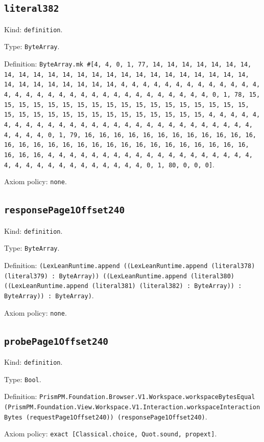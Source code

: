 \documentclass[11pt]{article}
\begin{document}
\subsection*{\texttt{literal382}}
\noindent Kind: \texttt{definition}.\par
\noindent Type: \texttt{ByteArray}.\par
\noindent Definition: \texttt{ByteArray.mk \#[4, 4, 0, 1, 77, 14, 14, 14, 14, 14, 14, 14, 14, 14, 14, 14, 14, 14, 14, 14, 14, 14, 14, 14, 14, 14, 14, 14, 14, 14, 14, 14, 14, 14, 14, 14, 14, 4, 4, 4, 4, 4, 4, 4, 4, 4, 4, 4, 4, 4, 4, 4, 4, 4, 4, 4, 4, 4, 4, 4, 4, 4, 4, 4, 4, 4, 4, 4, 4, 0, 1, 78, 15, 15, 15, 15, 15, 15, 15, 15, 15, 15, 15, 15, 15, 15, 15, 15, 15, 15, 15, 15, 15, 15, 15, 15, 15, 15, 15, 15, 15, 15, 15, 15, 4, 4, 4, 4, 4, 4, 4, 4, 4, 4, 4, 4, 4, 4, 4, 4, 4, 4, 4, 4, 4, 4, 4, 4, 4, 4, 4, 4, 4, 4, 4, 4, 0, 1, 79, 16, 16, 16, 16, 16, 16, 16, 16, 16, 16, 16, 16, 16, 16, 16, 16, 16, 16, 16, 16, 16, 16, 16, 16, 16, 16, 16, 16, 16, 16, 16, 16, 4, 4, 4, 4, 4, 4, 4, 4, 4, 4, 4, 4, 4, 4, 4, 4, 4, 4, 4, 4, 4, 4, 4, 4, 4, 4, 4, 4, 4, 4, 4, 4, 0, 1, 80, 0, 0, 0]}.\par
\noindent Axiom policy: \texttt{none}.\par
\subsection*{\texttt{responsePage1Offset240}}
\noindent Kind: \texttt{definition}.\par
\noindent Type: \texttt{ByteArray}.\par
\noindent Definition: \texttt{(LexLeanRuntime.append ((LexLeanRuntime.append (literal378) (literal379) : ByteArray)) ((LexLeanRuntime.append (literal380) ((LexLeanRuntime.append (literal381) (literal382) : ByteArray)) : ByteArray)) : ByteArray)}.\par
\noindent Axiom policy: \texttt{none}.\par
\subsection*{\texttt{probePage1Offset240}}
\noindent Kind: \texttt{definition}.\par
\noindent Type: \texttt{Bool}.\par
\noindent Definition: \texttt{PrismPM.Foundation.Browser.V1.Workspace.workspaceBytesEqual (PrismPM.Foundation.View.Workspace.V1.Interaction.workspaceInteractionBytes (requestPage1Offset240)) (responsePage1Offset240)}.\par
\noindent Axiom policy: \texttt{exact [Classical.choice, Quot.sound, propext]}.\par
\end{document}
